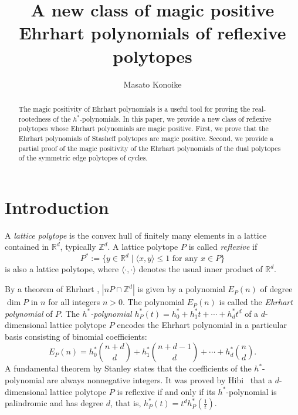 \documentclass[a4paper,reqno,11pt, oneside]{amsart}
\newcommand{\RR}{\mathbb{R}}
\theoremstyle{definition}
\theoremstyle{remark}
\begin{document}
\title{A new class of magic positive Ehrhart polynomials of reflexive polytopes}
\author{Masato Konoike}


\address[M. Konoike]{Department of Pure and Applied Mathematics, 
Graduate School of Information Science and Technology, 
Osaka University, Japan}


\maketitle

\begin{abstract} 
The magic positivity of Ehrhart polynomials is a useful tool for proving the real-rootedness of the $h^\ast$-polynomials. 
In this paper, we provide a new class of reflexive polytopes whose Ehrhart polynomials are magic positive. 
First, we prove that the Ehrhart polynomials of Stasheff polytopes are magic positive. 
Second, we provide a partial proof of the magic positivity of the Ehrhart polynomials of the dual polytopes of the symmetric edge polytopes of cycles.
\end{abstract}


\section{Introduction}
A \textit{lattice polytope} is the convex hull of finitely many elements in a lattice contained in $\mathbb{R}^d$, typically $\mathbb{Z}^d$. A lattice polytope $P$ is called \textit{reflexive} if
$$P^\ast := \{ y \in \RR^d \mid \langle x, y\rangle \leq 1 \text{ for any } x \in P\}$$
is also a lattice polytope, where $\langle \cdot, \cdot \rangle$ denotes the usual inner product of $\RR^d$. 

By a theorem of Ehrhart \cite{E}, $|nP\cap \mathbb{Z}^d|$ is given by a polynomial $E_P(n)$ of degree $\dim P$ in $n$ for all integers $n > 0$. The polynomial $E_P(n)$ is called the \textit{Ehrhart polynomial} of $P$. The \textit{$h^\ast$-polynomial} $h^\ast _P (t)=h_0^\ast +h_1^\ast t+\cdots +h_d^\ast t^d$ of a $d$-dimensional lattice polytope $P$ encodes the Ehrhart polynomial in a particular basis consisting of binomial coefficients:
$$E_P (n)=h_0^\ast \binom{n+d}{d} +h_1^\ast \binom{n+d-1}{d} +\cdots + h_d^\ast \binom{n}{d}.$$
A fundamental theorem by Stanley \cite{RS80} states that the coefficients of the $h^\ast$-polynomial are always nonnegative integers. It was proved by Hibi~\cite{H} that a $d$-dimensional lattice polytope $P$ is reflexive if and only if its $h^\ast$-polynomial is palindromic and has degree $d$, that is, $h^\ast _P (t)=t^dh^\ast _P \left(\frac{1}{t}\right)$.
\end{document}

